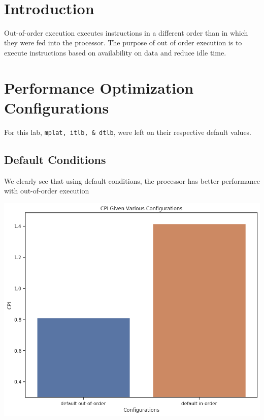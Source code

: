 \documentclass[twocolumn]{article}
\newcommand{\cc}[1]{\texttt{#1}}
\begin{document}
\

{\newpage}

\maketitle        


\section{Introduction}

Out-of-order execution executes instructions in a different order than in which they were fed into the processor. The purpose of out of order execution is to execute instructions based on availability on data and reduce idle time.

\section{Performance Optimization Configurations}

For this lab, \cc{mplat, itlb, \& dtlb}, were left on their respective default values.


\subsection{Default Conditions}

We clearly see that using default conditions, the processor has better performance with out-of-order execution


\begingroup
    \centering
    \medskip
    \includegraphics[width=0.6\columnwidth]{Lab-Tex/LabX-images/default.png}
    \label{fig:lsq}
    \medskip
\endgroup
\end{document}
